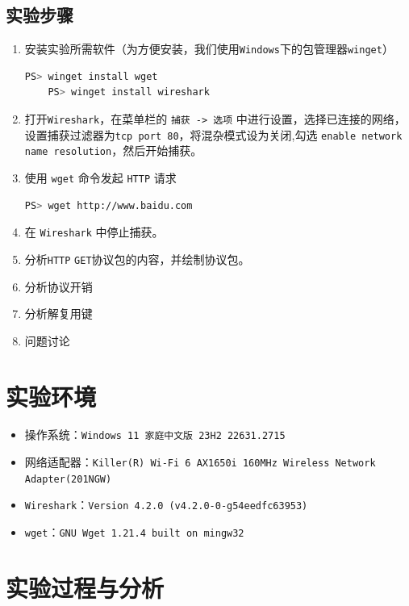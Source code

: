 \documentclass{article}
\begin{document}
\subsection{实验步骤}

\begin{enumerate}[noitemsep, label={{\arabic*})}]
  \item 安装实验所需软件（为方便安装，我们使用\texttt{Windows}下的包管理器\texttt{winget}）
        \begin{lstlisting}[language=bash]
    PS> winget install wget
    PS> winget install wireshark
    \end{lstlisting}
  \item 打开\texttt{Wireshark}，在菜单栏的 \texttt{捕获 -> 选项} 中进行设置，选择已连接的网络，设置捕获过滤器为\texttt{tcp port 80}，将混杂模式设为关闭,勾选 \texttt{enable network  name resolution}，然后开始捕获。
  \item 使用 \texttt{wget} 命令发起 \texttt{HTTP} 请求
        \begin{lstlisting}[language=bash]
    PS> wget http://www.baidu.com
    \end{lstlisting}
  \item 在 \texttt{Wireshark} 中停止捕获。
  \item 分析\texttt{HTTP} \texttt{GET}协议包的内容，并绘制协议包。
  \item 分析协议开销
  \item 分析解复用键
  \item 问题讨论
\end{enumerate}

\section{实验环境}


\begin{itemize}[noitemsep]
  \item 操作系统：\texttt{Windows 11 家庭中文版 23H2 22631.2715}
  \item 网络适配器：\texttt{Killer(R) Wi-Fi 6 AX1650i 160MHz Wireless Network \\ Adapter(201NGW)}
  \item \texttt{Wireshark}：\texttt{Version 4.2.0 (v4.2.0-0-g54eedfc63953)}
  \item \texttt{wget}：\texttt{GNU Wget 1.21.4 built on mingw32}
\end{itemize}


\section{实验过程与分析}
\end{document}
